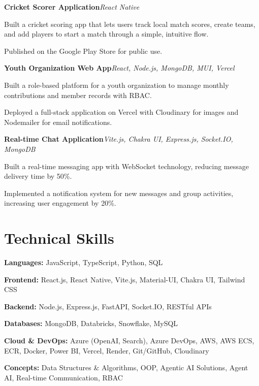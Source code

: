 \documentclass[a4paper,10pt]{article}
\newcommand{\projectentry}[2]{%
  \noindent\textbf{#1}\hfill\textit{\color{muted}#2}%
}
\newcommand{\skillrow}[2]{%
  \noindent\textbf{#1} #2\par\vspace{3pt}%
}
\begin{document}
\projectentry{Cricket Scorer Application}{React Native}

\vspace{2pt}
\begin{tight}
  \item Built a cricket scoring app that lets users track local match scores, create teams, and add players to start a match through a simple, intuitive flow.
  \item Published on the Google Play Store for public use.
\end{tight}

\vspace{5pt}
\projectentry{Youth Organization Web App}{React, Node.js, MongoDB, MUI, Vercel}

\vspace{2pt}
\begin{tight}
  \item Built a role-based platform for a youth organization to manage monthly contributions and member records with RBAC.
  \item Deployed a full-stack application on Vercel with Cloudinary for images and Nodemailer for email notifications.
\end{tight}

\vspace{5pt}
\projectentry{Real-time Chat Application}{Vite.js, Chakra UI, Express.js, Socket.IO, MongoDB}

\vspace{2pt}
\begin{tight}
  \item Built a real-time messaging app with WebSocket technology, reducing message delivery time by 50\%.
  \item Implemented a notification system for new messages and group activities, increasing user engagement by 20\%.
\end{tight}

\section{Technical Skills}
\skillrow{Languages:}{JavaScript, TypeScript, Python, SQL}
\skillrow{Frontend:}{React.js, React Native, Vite.js, Material-UI, Chakra UI, Tailwind CSS}
\skillrow{Backend:}{Node.js, Express.js, FastAPI, Socket.IO, RESTful APIs}
\skillrow{Databases:}{MongoDB, Databricks, Snowflake, MySQL}
\skillrow{Cloud \& DevOps:}{Azure (OpenAI, Search), Azure DevOps, AWS, AWS ECS, ECR, Docker, Power BI, Vercel, Render, Git/GitHub, Cloudinary}
\skillrow{Concepts:}{Data Structures \& Algorithms, OOP, Agentic AI Solutions, Agent AI, Real-time Communication, RBAC}
\end{document}
